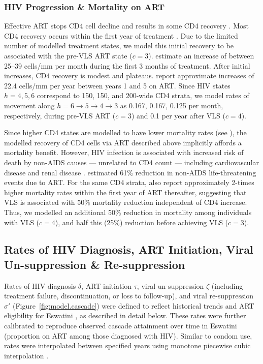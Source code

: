 \subsubsection{HIV Progression \& Mortality on ART}\label{mod.par.art.hiv}
\def\hunprog{$h = 6 \rightarrow 5 \rightarrow 4 \rightarrow 3$\xspace}
Effective ART stops CD4 cell decline and results in some CD4 recovery \cite{Battegay2006,Lawn2006}.
Most CD4 recovery occurs within the first year of treatment \cite{Battegay2006}.
Due to the limited number of modelled treatment states,
we model this initial recovery to be associated with the pre-VLS ART state ($c=3$).
\citet{Lawn2006,Gabillard2013} estimate an increase of between 25--39 cells/mm per month
during the first 3 months of treatment.
After initial increases, CD4 recovery is modest and plateaus.
\citet{Battegay2006} report approximate increases of
22.4 cells/mm per year between years 1 and 5 on ART.
Since HIV states $h=4,5,6$ correspond to 150, 150, and 200-wide CD4 strata,
we model rates of movement along \hunprog as
0.167, 0.167, 0.125 per month, respectively, during pre-VLS ART ($c=3$) and
0.1 per year after VLS ($c=4$).
\par
Since higher CD4 states are modelled to have lower mortality rates (see ),
the modelled recovery of CD4 cells via ART described above implicitly affords a mortality benefit.
However, HIV infection is associated with increased risk of death by non-AIDS causes
--- \ie unrelated to CD4 count ---
including cardiovascular disease and renal disease \cite{Phillips2008}.
\citet{Lundgren2015init} estimated 61\% reduction in non-AIDS life-threatening events due to ART.
For the same CD4 strata, \citet{Gabillard2013} also report approximately 2-times higher
mortality rates within the first year of ART \vs thereafter,
suggesting that VLS is associated with 50\% mortality reduction independent of CD4 increase.
Thus, we modelled an additional 50\% reduction in mortality among individuals with VLS ($c=4$),
and half this (25\%) reduction before achieving VLS ($c=3$).
\subsection{Rates of HIV Diagnosis, ART Initiation, Viral Un-suppression \& Re-suppression}\label{mod.par.cascade}
Rates of HIV diagnosis $\delta$, ART initiation $\tau$, viral un-suppression $\zeta$
(including treatment failure, discontinuation, or loss to follow-up),
and viral re-suppression $\sigma'$ (Figure~\ref{fig:model.cascade})
were defined to reflect historical trends and ART eligibility for Eswatini
\cite{EswMOH2006gui,EswMOH2010gui,EswMOH2015gui,EswMOH2018gui}, as described in detail below.
These rates were further calibrated to reproduce observed cascade attainment over time in Eswatini
(\eg proportion on ART among those diagnosed with HIV).
Similar to condom use, rates were interpolated between specified years
using monotone piecewise cubic interpolation \cite{Fritsch1980}.
